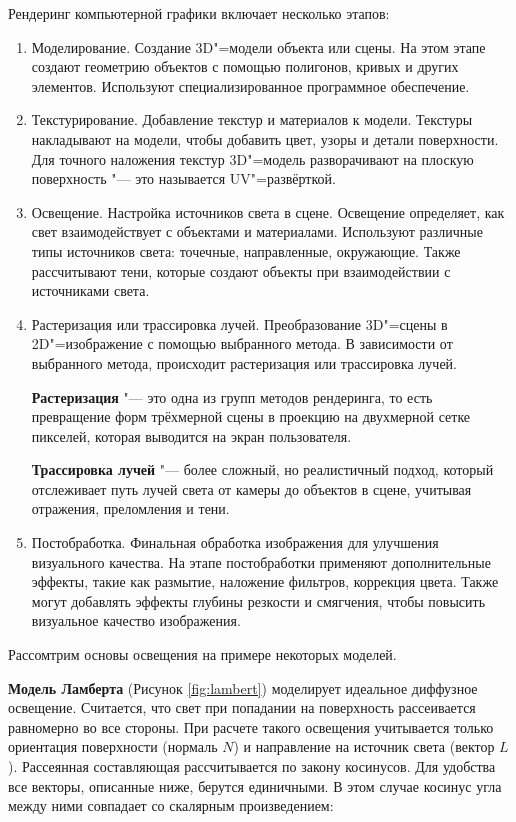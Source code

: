 Рендеринг компьютерной графики включает несколько этапов: 
\begin{enumerate}
    \item Моделирование. Создание 3D"=модели объекта или сцены. На этом этапе создают геометрию объектов с помощью полигонов, кривых и других элементов. Используют специализированное программное обеспечение.  
    \item Текстурирование. Добавление текстур и материалов к модели. Текстуры накладывают на модели, чтобы добавить цвет, узоры и детали поверхности. Для точного наложения текстур 3D"=модель разворачивают на плоскую поверхность "--- это называется UV"=развёрткой.
    \item Освещение. Настройка источников света в сцене.  Освещение определяет, как свет взаимодействует с объектами и материалами. Используют различные типы источников света: точечные, направленные, окружающие. Также рассчитывают тени, которые создают объекты при взаимодействии с источниками света.  
    \item Растеризация или трассировка лучей. Преобразование 3D"=сцены в 2D"=изображение с помощью выбранного метода. В зависимости от выбранного метода, происходит растеризация или трассировка лучей.  
    
    \textbf{Растеризация} "--- это одна из групп методов рендеринга, то есть превращение форм трёхмерной сцены в проекцию на двухмерной сетке пикселей, которая выводится на экран пользователя. 
    
    \textbf{Трассировка лучей} "--- более сложный, но реалистичный подход, который отслеживает путь лучей света от камеры до объектов в сцене, учитывая отражения, преломления и тени.
    \item Постобработка. Финальная обработка изображения для улучшения визуального качества.  На этапе постобработки применяют дополнительные эффекты, такие как размытие, наложение фильтров, коррекция цвета. Также могут добавлять эффекты глубины резкости и смягчения, чтобы повысить визуальное качество изображения.
\end{enumerate}

Рассомтрим основы освещения на примере некоторых моделей.

\textbf{Модель Ламберта} (Рисунок \ref{fig:lambert}) моделирует идеальное диффузное освещение. Считается, что свет при попадании на поверхность рассеивается равномерно во все стороны. При расчете такого освещения учитывается только ориентация поверхности (нормаль $N$) и направление на источник света (вектор $L$). Рассеянная составляющая рассчитывается по закону косинусов. Для удобства все векторы, описанные ниже, берутся единичными. В этом случае косинус угла между ними совпадает со скалярным произведением:

